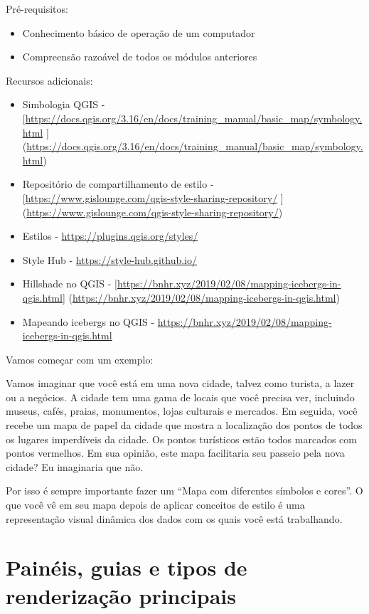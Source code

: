 \documentclass[
]{krantz}
\providecommand{\tightlist}{%
  \setlength{\itemsep}{0pt}\setlength{\parskip}{0pt}}
\begin{document}
Pré-requisitos:

\begin{itemize}
\tightlist
\item
  Conhecimento básico de operação de um computador
\item
  Compreensão razoável de todos os módulos anteriores
\end{itemize}

Recursos adicionais:

\begin{itemize}
\tightlist
\item
  Simbologia QGIS - {[}\url{https://docs.qgis.org/3.16/en/docs/training_manual/basic_map/symbology.html} {]} (\url{https://docs.qgis.org/3.16/en/docs/training_manual/basic_map/symbology.html})
\item
  Repositório de compartilhamento de estilo - {[}\url{https://www.gislounge.com/qgis-style-sharing-repository/} {]} (\url{https://www.gislounge.com/qgis-style-sharing-repository/})
\item
  Estilos - \href{https://plugins.qg\%20is.org/styles/}{https://plugins.qgis.org/styles/}
\item
  Style Hub - \url{https://style-hub.github.io/}
\item
  Hillshade no QGIS - {[}\url{https://bnhr.xyz/2019/02/08/mapping-icebergs-in-qgis.html}{]} (\url{https://bnhr.xyz/2019/02/08/mapping-icebergs-in-qgis.html})
\item
  Mapeando icebergs no QGIS - \url{https://bnhr.xyz/2019/02/08/mapping-icebergs-in-qgis.html}
\end{itemize}

Vamos começar com um exemplo:

Vamos imaginar que você está em uma nova cidade, talvez como turista, a lazer ou a negócios. A cidade tem uma gama de locais que você precisa ver, incluindo museus, cafés, praias, monumentos, lojas culturais e mercados. Em seguida, você recebe um mapa de papel da cidade que mostra a localização dos pontos de todos os lugares imperdíveis da cidade. Os pontos turísticos estão todos marcados com pontos vermelhos. Em sua opinião, este mapa facilitaria seu passeio pela nova cidade? Eu imaginaria que não.

Por isso é sempre importante fazer um ``Mapa com diferentes símbolos e cores''. O que você vê em seu mapa depois de aplicar conceitos de estilo é uma representação visual dinâmica dos dados com os quais você está trabalhando.

\hypertarget{painuxe9is-guias-e-tipos-de-renderizauxe7uxe3o-principais}{%
\section{Painéis, guias e tipos de renderização principais}\label{painuxe9is-guias-e-tipos-de-renderizauxe7uxe3o-principais}}
\end{document}
